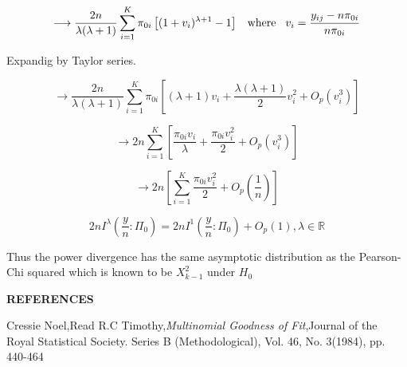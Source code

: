 \documentclass{article}\usepackage[]{graphicx}\usepackage[]{color}
\numberwithin{equation}{subsection} %
\newenvironment{proof}[1][Proof]{\begin{trivlist}
\item[\hskip \labelsep {\bfseries #1}]}{\end{trivlist}}
\begin{document}
\begin{proof}
\begin{equation*}
\longrightarrow \frac{2n}{\lambda(\lambda+1)}\sum\limits_{i=1}^{K}\pi_{0i}\left[(1+v_{i})^{\lambda+1}  -1\right]  \hspace{3mm}\text{where}\hspace{3mm} v_{i}= \frac{y_{ij}-n\pi_{0i}}{n\pi_{0i}}
\end{equation*}

Expandig by Taylor series.

\begin{equation*}
\longrightarrow \frac{2n}{\lambda(\lambda+1)}\sum\limits_{i=1}^{K}\pi_{0i}\left[(\lambda+1)v_{i}+\frac{\lambda(\lambda+1)}{2}v_{i}^{2}+O_{p}(v_{i}^{3})\right]  
\end{equation*}

\begin{equation*}
\longrightarrow 2n\sum\limits_{i=1}^{K}\left[\frac{\pi_{0i}v_{i}}{\lambda}+\frac{\pi_{0i}v_{i}^{2}}{2}+O_{p}(v_{i}^{3})\right]  
\end{equation*}

\begin{equation*}
\longrightarrow 2n\left[\sum\limits_{i=1}^{K}\frac{\pi_{0i}v_{i}^{2}}{2}+O_{p}(\frac{1}{n})\right]  
\end{equation*}


\begin{equation*}
2nI^{\lambda}\left(\frac{y}{n}:\Pi_{0} \right)=2nI^{1}\left(\frac{y}{n}:\Pi_{0} \right) +O_{p}(1),\lambda \in \mathbb{R}
\end{equation*}

Thus the power divergence has the same asymptotic distribution as the Pearson-Chi squared which is known to be $X^{2}_{k-1}$ under $H_{0}$

\end{proof}



\cleardoublepage

\newpage
\begin{center}
{\bf REFERENCES}
\end{center}
\begin{thebiblio}{99}

Cressie Noel,Read R.C Timothy,\emph{Multinomial Goodness of Fit},Journal of the Royal Statistical Society. Series B (Methodological), Vol. 46, No. 3(1984), pp. 440-464



\end{thebiblio}
\end{document}
